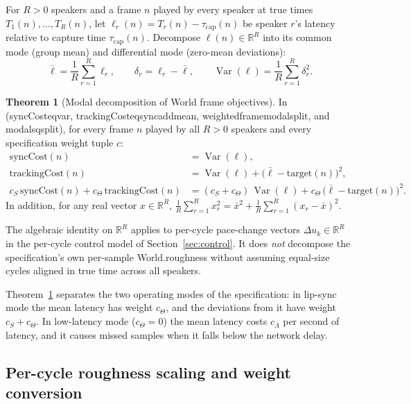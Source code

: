 \documentclass[11pt,a4paper]{article}
\DeclareRobustCommand{\lean}[1]{{\ttfamily\def\_{\textunderscore\allowbreak}#1}}
\newcommand{\R}{\mathbb{R}}
\theoremstyle{definition}
\newtheorem{theorem}[definition]{Theorem}
\begin{document}
For $R > 0$ speakers and a frame $n$ played by every speaker at true times
$T_1(n), \dots, T_R(n)$, let $\ell_r(n) = T_r(n) - \tau_{\mathrm{cap}}(n)$ be
speaker $r$'s latency relative to capture time $\tau_{\mathrm{cap}}(n)$.
Decompose $\ell(n) \in \R^R$ into its common mode (group mean) and differential
mode (zero-mean deviations):
\[
  \bar\ell = \frac{1}{R}\sum_{r=1}^R \ell_r,
  \qquad
  \delta_r = \ell_r - \bar\ell,
  \qquad
  \operatorname{Var}(\ell) = \frac{1}{R}\sum_{r=1}^R \delta_r^2 .
\]

\begin{theorem}[Modal decomposition of \lean{World} frame objectives]
\label{thm:modal-spec}
In  (\lean{syncCost\_eq\_var},
\lean{trackingCost\_eq\_sync\_add\_mean}, \lean{weighted\_frame\_modal\_split},
and \lean{modal\_sq\_split}), for every frame $n$ played by all $R > 0$
speakers and every specification weight tuple $c$:
\begin{align*}
  \mathrm{syncCost}(n) &= \operatorname{Var}(\ell), \\
  \mathrm{trackingCost}(n) &= \operatorname{Var}(\ell)
    + \bigl(\bar\ell - \mathrm{target}(n)\bigr)^2, \\
  c_S\,\mathrm{syncCost}(n) + c_\Theta\,\mathrm{trackingCost}(n)
    &= (c_S + c_\Theta)\,\operatorname{Var}(\ell)
    + c_\Theta\,\bigl(\bar\ell - \mathrm{target}(n)\bigr)^2 .
\end{align*}
In addition, for any real vector $x \in \R^R$,
$\frac{1}{R}\sum_{r=1}^R x_r^2 = \bar x^2 + \frac{1}{R}\sum_{r=1}^R (x_r - \bar x)^2$.
\end{theorem}

The algebraic identity on $\R^R$ applies to per-cycle pace-change vectors
$\Delta u_k \in \R^R$ in the per-cycle control model of
Section~\ref{sec:control}. It does \emph{not} decompose the specification's own
per-sample \lean{World.roughness} without assuming equal-size cycles aligned in
true time across all speakers.

Theorem~\ref{thm:modal-spec} separates the two operating modes of the
specification: in lip-sync mode the mean latency has weight $c_\Theta$, and the
deviations from it have weight $c_S + c_\Theta$. In low-latency mode
($c_\Theta = 0$) the mean latency costs $c_\Lambda$ per second of latency, and
it causes missed samples when it falls below the network delay.

\subsection{Per-cycle roughness scaling and weight conversion}
\end{document}
